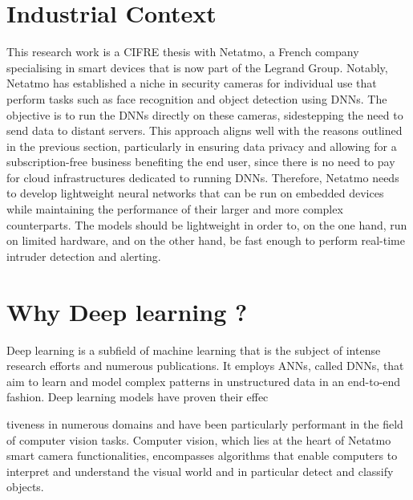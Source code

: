 \section{Industrial Context}


This research work is a CIFRE thesis with Netatmo, a French company specialising
in smart devices that is now part of the Legrand Group. Notably, Netatmo has
established a niche in security cameras for individual use that perform tasks
such as face recognition and object detection using \acp{DNN}. The objective is
to run the \acp{DNN} directly on these cameras, sidestepping the need to send
data to distant servers. This approach aligns well with the reasons outlined in
the previous section, particularly in ensuring data privacy and allowing for a
subscription-free business benefiting the end user, since there is no need to
pay for cloud infrastructures dedicated to running \acp{DNN}. Therefore, Netatmo
needs to develop lightweight neural networks that can be run on embedded devices
while maintaining the performance of their larger and more complex counterparts.
The models should be lightweight in order to, on the one hand, run on limited
hardware, and on the other hand, be fast enough to perform real-time intruder
detection and alerting.\\

\section{Why Deep learning ?}

Deep learning is a subfield of machine learning that is the subject of intense
research efforts and numerous publications. It employs \aclp{ANN}, called
\acfp{DNN}, that aim to learn and model complex patterns in unstructured data in
an end-to-end fashion. Deep learning models have proven their effec 



tiveness in
numerous domains and have been particularly performant in the field of computer
vision tasks. Computer vision, which lies at the heart of Netatmo smart camera
functionalities, encompasses algorithms that enable computers to interpret and
understand the visual world and in particular detect and classify objects.\\

